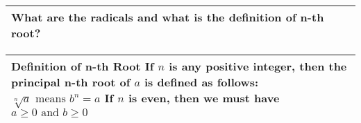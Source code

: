 \begin{small}
    \begin{tabularx}{1\textwidth}{
            p{}
        }
        \toprule
        What are the radicals and what is the definition of n-th root?
        \\
        \bottomrule

    \end{tabularx}
\end{small}

\begin{small}
    \begin{tabularx}{1\textwidth}{
            p{}
        }
        \toprule
        \makecell{
            \textbf{Definition of n-th Root}\\
            If $n$ is any positive integer, then the principal n-th root of $a$
            is defined as follows:\\
            $\sqrt[n]{a} \text{ means } b^n = a $\\
            If $n$ is even, then we must have $a \geq 0 \text{ and } b \geq 0$\\
        }
        \\
        \bottomrule
    \end{tabularx}
\end{small}

